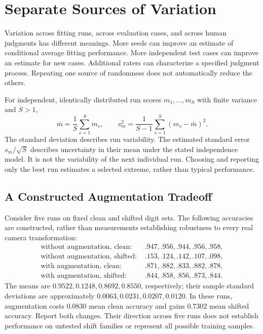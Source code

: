 \section{Separate Sources of Variation}

Variation across fitting runs, across evaluation cases, and across human judgments has different meanings. More seeds can improve an estimate of conditional average fitting performance. More independent test cases can improve an estimate for new cases. Additional raters can characterize a specified judgment process. Repeating one source of randomness does not automatically reduce the others.

For independent, identically distributed run scores $m_1,\ldots,m_S$ with finite variance and $S>1$,
\[
\bar m=\frac1S\sum_{s=1}^S m_s,\qquad
s_m^2=\frac1{S-1}\sum_{s=1}^S(m_s-\bar m)^2.
\]
The standard deviation describes run variability. The estimated standard error $s_m/\sqrt S$ describes uncertainty in their mean under the stated independence model. It is not the variability of the next individual run. Choosing and reporting only the best run estimates a selected extreme, rather than typical performance.

\subsection{A Constructed Augmentation Tradeoff}

Consider five runs on fixed clean and shifted digit sets. The following accuracies are constructed, rather than measurements establishing robustness to every real camera transformation:
\[
\begin{aligned}
\text{without augmentation, clean: }& .947,.956,.944,.956,.958,\\
\text{without augmentation, shifted: }& .153,.124,.142,.107,.098,\\
\text{with augmentation, clean: }& .871,.882,.833,.882,.878,\\
\text{with augmentation, shifted: }& .844,.858,.856,.873,.844.
\end{aligned}
\]
The means are $0.9522,0.1248,0.8692,0.8550$, respectively; their sample standard deviations are approximately $0.0063,0.0231,0.0207,0.0120$. In these runs, augmentation costs $0.0830$ mean clean accuracy and gains $0.7302$ mean shifted accuracy. Report both changes. Their direction across five runs does not establish performance on untested shift families or represent all possible training samples.

